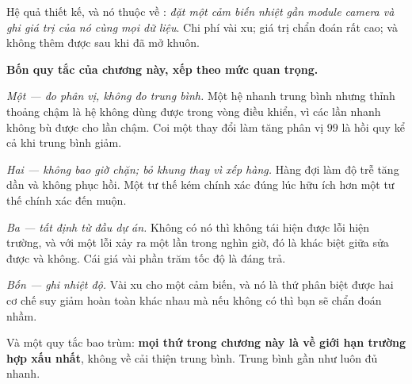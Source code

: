 \documentclass[../../vslam.tex]{subfiles}
\begin{document}
Hệ quả thiết kế, và nó thuộc về : \emph{đặt một cảm biến nhiệt gần module camera và ghi giá trị của nó cùng mọi dữ liệu}. Chi phí vài xu; giá trị chẩn đoán rất cao; và không thêm được sau khi đã mở khuôn.

\begin{cannho}
\textbf{Bốn quy tắc của chương này, xếp theo mức quan trọng.}

\emph{Một --- đo phân vị, không đo trung bình.} Một hệ nhanh trung bình nhưng thỉnh thoảng chậm là hệ không dùng được trong vòng điều khiển, vì các lần nhanh không bù được cho lần chậm. Coi một thay đổi làm tăng phân vị \(99\) là hồi quy kể cả khi trung bình giảm.

\emph{Hai --- không bao giờ chặn; bỏ khung thay vì xếp hàng.} Hàng đợi làm độ trễ tăng dần và không phục hồi. Một tư thế kém chính xác đúng lúc hữu ích hơn một tư thế chính xác đến muộn.

\emph{Ba --- tất định từ đầu dự án.} Không có nó thì không tái hiện được lỗi hiện trường, và với một lỗi xảy ra một lần trong nghìn giờ, đó là khác biệt giữa sửa được và không. Cái giá vài phần trăm tốc độ là đáng trả.

\emph{Bốn --- ghi nhiệt độ.} Vài xu cho một cảm biến, và nó là thứ phân biệt được hai cơ chế suy giảm hoàn toàn khác nhau mà nếu không có thì bạn sẽ chẩn đoán nhầm.

Và một quy tắc bao trùm: \textbf{mọi thứ trong chương này là về giới hạn trường hợp xấu nhất}, không về cải thiện trung bình. Trung bình gần như luôn đủ nhanh.
\end{cannho}

\begin{ungdung}
\end{ungdung}
\end{document}

